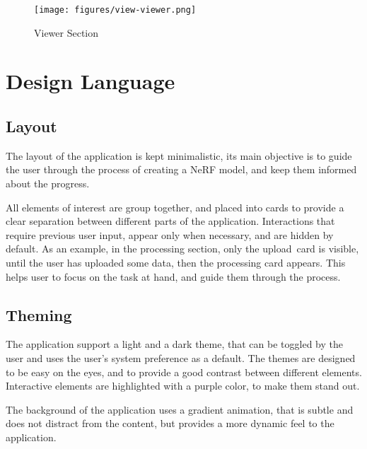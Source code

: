 \begin{figure}[htb]
  \texttt{[image: figures/view-viewer.png]}
  \caption{Viewer Section}
  \label{fig:design:viewer-section}
\end{figure}

\section{Design Language}

\subsection{Layout}

The layout of the application is kept minimalistic, its main objective is to guide the user through the process of creating a NeRF model, and keep them informed about the progress.

All elements of interest are group together, and placed into cards to provide a clear separation between different parts of the application.
Interactions that require previous user input, appear only when necessary, and are hidden by default.
As an example, in the processing section, only the upload card is visible, until the user has uploaded some data, then the processing card appears.
This helps user to focus on the task at hand, and guide them through the process.

\subsection{Theming}

The application support a light and a dark theme, that can be toggled by the user and uses the user's system preference as a default.
The themes are designed to be easy on the eyes, and to provide a good contrast between different elements.
Interactive elements are highlighted with a purple color, to make them stand out.

The background of the application uses a gradient animation, that is subtle and does not distract from the content, but provides a more dynamic feel to the application.
